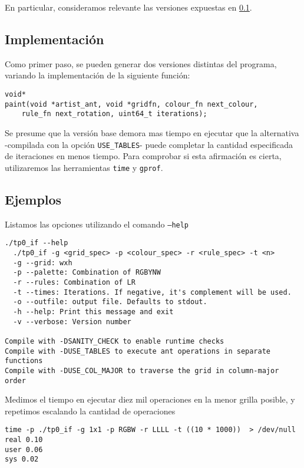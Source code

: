 \documentclass{article}
\begin{document}
En particular, consideramos relevante las versiones expuestas en \ref{secc:impl}.

\subsection{Implementación}
\label{secc:impl}

Como primer paso, se pueden generar dos versiones distintas del programa, variando la implementación de la siguiente
función:
\begin{small}
\begin{verbatim}
void*
paint(void *artist_ant, void *gridfn, colour_fn next_colour, 
    rule_fn next_rotation, uint64_t iterations);
\end{verbatim}
\end{small}

Se presume que la versión base demora mas tiempo en ejecutar que la alternativa -compilada con la opción 
\texttt{USE\_TABLES}- puede completar la cantidad especificada de iteraciones en menos tiempo.  Para comprobar si esta 
afirmación es cierta, utilizaremos las herramientas \texttt{time} y \texttt{gprof}.

\subsection{Ejemplos}

Listamos las opciones utilizando el comando \texttt{--help}
\begin{verbatim}
./tp0_if --help
  ./tp0_if -g <grid_spec> -p <colour_spec> -r <rule_spec> -t <n>
  -g --grid: wxh
  -p --palette: Combination of RGBYNW
  -r --rules: Combination of LR
  -t --times: Iterations. If negative, it's complement will be used.
  -o --outfile: output file. Defaults to stdout.
  -h --help: Print this message and exit
  -v --verbose: Version number

Compile with -DSANITY_CHECK to enable runtime checks
Compile with -DUSE_TABLES to execute ant operations in separate functions
Compile with -DUSE_COL_MAJOR to traverse the grid in column-major order
\end{verbatim}

Medimos el tiempo en ejecutar diez mil operaciones en la menor grilla posible, y repetimos escalando la cantidad
de operaciones
\begin{verbatim}
time -p ./tp0_if -g 1x1 -p RGBW -r LLLL -t ((10 * 1000))  > /dev/null
real 0.10
user 0.06
sys 0.02
\end{verbatim}
\end{document}
